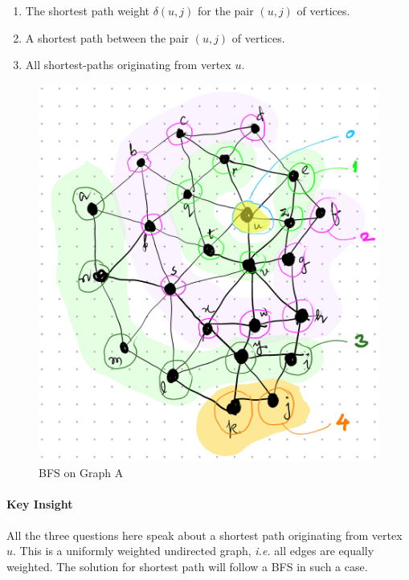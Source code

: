 \documentclass[11pt]{article}
\begin{document}
\begin{enumerate}
\item The shortest path weight \(\delta(u,j)\) for the pair
\((u,j)\) of vertices.
\item A shortest path between the pair \((u,j)\) of
vertices.
\item All shortest-paths originating from vertex \(u\).
\end{enumerate}

\begin{figure}[htbp]
\centering
\includegraphics[width=\linewidth]{images/bfsOnGraphA.png}
\caption{\label{fig:bfsOnGraphA}BFS on Graph A}
\end{figure}
\paragraph*{Key Insight}
\label{sec:org11ff5a9}
All the three questions here speak about a shortest
path originating from vertex \(u\).  This is a uniformly
weighted undirected graph, \emph{i.e.} all edges are equally
weighted.  The solution for shortest path will follow a
BFS in such a case.
\end{document}

